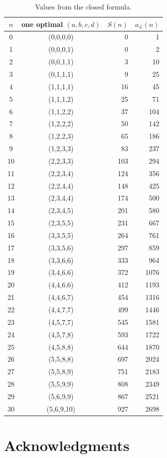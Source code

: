 \documentclass[12pt]{article}
\theoremstyle{plain}
\theoremstyle{definition}
\theoremstyle{remark}
\newcommand{\Lop}{\mathcal L}
\begin{document}
\begin{table}[htbp]
\centering
\begin{tabular}{@{}c c r r@{}}
\toprule
\(n\)&one optimal \((a,b,c,d)\)&\(S(n)\)&\(a_{\Lop}(n)\)\\
\midrule
0&(0,0,0,0)&0&1\\
1&(0,0,0,1)&0&2\\
2&(0,0,1,1)&3&10\\
3&(0,1,1,1)&9&25\\
4&(1,1,1,1)&16&45\\
5&(1,1,1,2)&25&71\\
6&(1,1,2,2)&37&104\\
7&(1,2,2,2)&50&142\\
8&(1,2,2,3)&65&186\\
9&(1,2,3,3)&83&237\\
10&(2,2,3,3)&103&294\\
11&(2,2,3,4)&124&356\\
12&(2,2,4,4)&148&425\\
13&(2,3,4,4)&174&500\\
14&(2,3,4,5)&201&580\\
15&(2,3,5,5)&231&667\\
16&(3,3,5,5)&264&761\\
17&(3,3,5,6)&297&859\\
18&(3,3,6,6)&333&964\\
19&(3,4,6,6)&372&1076\\
20&(4,4,6,6)&412&1193\\
21&(4,4,6,7)&454&1316\\
22&(4,4,7,7)&499&1446\\
23&(4,5,7,7)&545&1581\\
24&(4,5,7,8)&593&1722\\
25&(4,5,8,8)&644&1870\\
26&(5,5,8,8)&697&2024\\
27&(5,5,8,9)&751&2183\\
28&(5,5,9,9)&808&2349\\
29&(5,6,9,9)&867&2521\\
30&(5,6,9,10)&927&2698\\
\bottomrule
\end{tabular}
\caption{Values from the closed formula.}
\end{table}
\section*{Acknowledgments}
\end{document}
